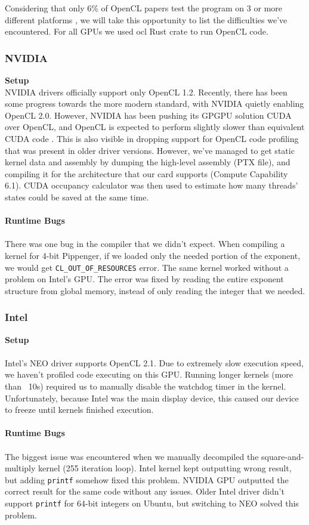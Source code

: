 Considering that only 6\% of OpenCL papers test the program on 3 or more different platforms \cite{sorensen2016hitchhiker}, we will take this opportunity to list the difficulties we've encountered. For all GPUs we used ocl Rust crate to run OpenCL code.

\subsubsection{NVIDIA}
\textbf{Setup}\\
NVIDIA drivers officially support only OpenCL 1.2. Recently, there has been some progress towards the more modern standard, with NVIDIA quietly enabling OpenCL 2.0. However, NVIDIA has been pushing its GPGPU solution CUDA over OpenCL, and OpenCL is expected to perform slightly slower than equivalent CUDA code \cite{fang2011comprehensive, karimi2010performance}. This is also visible in dropping support for OpenCL code profiling that was present in older driver versions. However, we've managed to get static kernel data and assembly by dumping the high-level assembly (PTX file), and compiling it for the architecture that our card supports (Compute Capability 6.1). CUDA occupancy calculator was then used to estimate how many threads' states could be saved at the same time.\\\\
\textbf{Runtime Bugs}\\\\
There was one bug in the compiler that we didn't expect. When compiling a kernel for 4-bit Pippenger, if we loaded only the needed portion of the exponent, we would get \texttt{CL\_OUT\_OF\_RESOURCES} error. The same kernel worked without a problem on Intel's GPU. The error was fixed by reading the entire exponent structure from global memory, instead of only reading the integer that we needed.

\subsubsection{Intel}
\textbf{Setup}\\\\
Intel's NEO driver supports OpenCL 2.1. Due to extremely slow execution speed, we haven't profiled code executing on this GPU. Running longer kernels (more than ~10s) required us to manually disable the watchdog timer in the kernel. Unfortunately, because Intel was the main display device, this caused our device to freeze until kernels finished execution.\\\\
\textbf{Runtime Bugs}\\\\
The biggest issue was encountered when we manually decompiled the square-and-multiply kernel (255 iteration loop). Intel kernel kept outputting wrong result, but adding \texttt{printf} somehow fixed this problem. NVIDIA GPU outputted the correct result for the same code without any issues. Older Intel driver didn't support \texttt{printf} for 64-bit integers on Ubuntu, but switching to NEO solved this problem. 

